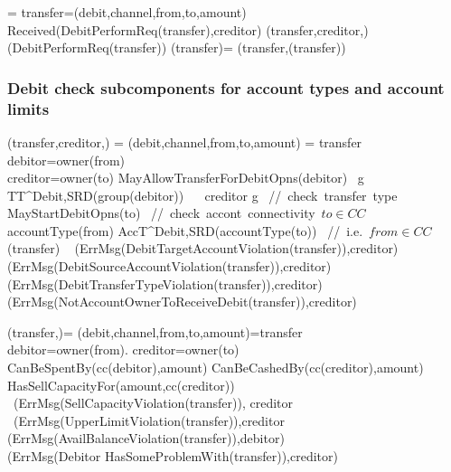 \begin{asm}
	  =\+
	\LET 	transfer=(debit,channel,from,to,amount)\\
	\IF Received(DebitPerformReq(transfer),\FROM creditor) \THEN \+  
	(transfer,creditor,)\\
	(DebitPerformReq(transfer)) \dec\-
	\WHERE \+
	(transfer)=\+
	(transfer,(transfer))
\end{asm}

 \subsubsection{Debit check subcomponents for account types and account limits}
 \begin{asm}
 (transfer,creditor,)  =\+
	\LET (debit,channel,from,to,amount) = transfer \\
	\LET debitor=owner(from)\\
	\IF creditor=owner(to) \AND MayAllowTransferForDebitOpns(debitor) \THEN \+
		\IF~\FORSOME g \in TT^{Debit,SRD}(group(debitor))
 		~~ creditor \in g \THEN \mbox{  // check transfer type} \+
			\IF MayStartDebitOpns(to)    \mbox{  // check accont connectivity $to \in CC$} \THEN \+
				\IF accountType(from) \in AccT^{Debit,SRD}(accountType(to)) \THEN
				\mbox{ // i.e. $from \in CC$}\+
					(transfer) \-
				\ELSE ~ (ErrMsg(DebitTargetAccountViolation(transfer)),\TO creditor) \- 
			\ELSE ~ (ErrMsg(DebitSourceAccountViolation(transfer)),\TO creditor)  \-
		\ELSE ~ (ErrMsg(DebitTransferTypeViolation(transfer)),\TO creditor) \-
	\ELSE ~ (ErrMsg(NotAccountOwnerToReceiveDebit(transfer)),\TO creditor)
 \end{asm}

\begin{asm}
              (transfer,)= \+
              \LET (debit,channel,from,to,amount)=transfer \\
              \LET debitor=owner(from). creditor=owner(to)\\
              \IF CanBeSpentBy(cc(debitor),amount) \THEN \+
		\IF CanBeCashedBy(cc(creditor),amount) \THEN \+
			\IF HasSellCapacityFor(amount,cc(creditor)) \THEN \+
				 \-
			\ELSE~(ErrMsg(SellCapacityViolation(transfer)), \TO creditor\-
		\ELSE~(ErrMsg(UpperLimitViolation(transfer)),\TO creditor\-
	\ELSE \+
                 (ErrMsg(AvailBalanceViolation(transfer)),\TO debitor) \\
                 (ErrMsg(Debitor HasSomeProblemWith(transfer)),\TO creditor)
\end{asm}
  
